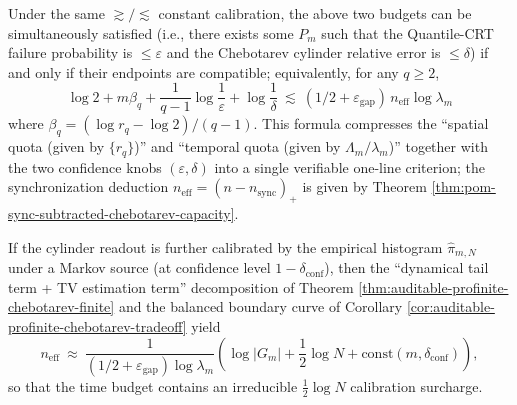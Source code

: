 \begin{remark}\label{rem:pom-space-time-confidence-law}
Under the same \(\gtrsim/\lesssim\) constant calibration, the above two budgets can be simultaneously satisfied (i.e., there exists some \(P_m\) such that the Quantile-CRT failure probability is \(\le\varepsilon\) and the Chebotarev cylinder relative error is \(\le\delta\)) if and only if their endpoints are compatible; equivalently, for any \(q\ge 2\),
\[
\boxed{
\log 2+m\beta_q+\frac{1}{q-1}\log\frac{1}{\varepsilon}+\log\frac{1}{\delta}
\ \lesssim\
(1/2+\varepsilon_{\mathrm{gap}})\,n_{\mathrm{eff}}\log\lambda_m
}
\]
where \(\beta_q=(\log r_q-\log 2)/(q-1)\).
This formula compresses the ``spatial quota (given by \(\{r_q\}\))'' and ``temporal quota (given by \(\Lambda_m/\lambda_m\))'' together with the two confidence knobs \((\varepsilon,\delta)\) into a single verifiable one-line criterion; the synchronization deduction \(n_{\mathrm{eff}}=(n-n_{\mathrm{sync}})_+\) is given by Theorem \ref{thm:pom-sync-subtracted-chebotarev-capacity}.
\par
If the cylinder readout is further calibrated by the empirical histogram \(\hat{\pi}_{m,N}\) under a Markov source (at confidence level \(1-\delta_{\mathrm{conf}}\)), then the ``dynamical tail term + TV estimation term'' decomposition of Theorem \ref{thm:auditable-profinite-chebotarev-finite} and the balanced boundary curve of Corollary \ref{cor:auditable-profinite-chebotarev-tradeoff} yield
\[
n_{\mathrm{eff}}\ \approx\
\frac{1}{(1/2+\varepsilon_{\mathrm{gap}})\log\lambda_m}\left(\log|G_m|+\frac12\log N+\mathrm{const}(m,\delta_{\mathrm{conf}})\right),
\]
so that the time budget contains an irreducible \(\tfrac12\log N\) calibration surcharge.
\end{remark}

